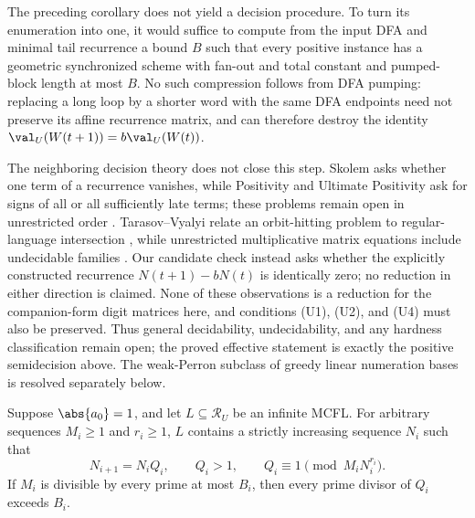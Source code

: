 \begin{remark}
  \label{rem:general-decision-interface}
  The preceding corollary does not yield a decision procedure. To turn
  its enumeration into one, it would suffice to compute from the input
  DFA and minimal tail recurrence a bound \(B\) such that every positive
  instance has a geometric synchronized scheme with fan-out and total
  constant and pumped-block length at most \(B\). No such compression
  follows from DFA pumping: replacing a long loop by a shorter word with
  the same DFA endpoints need not preserve its affine recurrence matrix,
  and can therefore destroy the identity
  \(\val_U(W(t+1))=b\val_U(W(t))\).

  The neighboring decision theory does not close this step. Skolem asks
  whether one term of a recurrence vanishes, while Positivity and Ultimate
  Positivity ask for signs of all or all sufficiently late terms; these
  problems remain open in unrestricted order
  \cite{OuaknineWorrell2012,AkshayBazilleGenestVahanwala2024}.
  Tarasov--Vyalyi relate an orbit-hitting problem to regular-language
  intersection \cite{TarasovVyalyi2011}, while unrestricted multiplicative
  matrix equations include undecidable families
  \cite{BellEtAl2008MatrixEquations}. Our candidate check instead asks
  whether the explicitly constructed recurrence
  \(N(t+1)-bN(t)\) is identically zero; no reduction in either direction is
  claimed. None of these observations is a reduction for the companion-form
  digit matrices here, and conditions
  \textup{(U1)}, \textup{(U2)}, and \textup{(U4)} must also be preserved.
  Thus general decidability,
  undecidability, and any hardness classification remain open; the proved
  effective statement is exactly the positive semidecision above. The
  weak-Perron subclass of greedy linear numeration bases is resolved
  separately below.
\end{remark}

\begin{theorem}
  \label{thm:unit-mcfl-deep-congruence-chain}
  Suppose \(\abs{a_0}=1\), and let \(L\subseteq\mathcal R_U\) be an
  infinite MCFL. For arbitrary sequences \(M_i\ge1\) and \(r_i\ge1\),
  \(L\) contains a strictly increasing sequence \(N_i\) such that
  \[
    N_{i+1}=N_iQ_i,\qquad Q_i>1,\qquad
    Q_i\equiv1\pmod {M_iN_i^{r_i}}.
  \]
  If \(M_i\) is divisible by every prime at most \(B_i\), then every
  prime divisor of \(Q_i\) exceeds \(B_i\).
\end{theorem}

